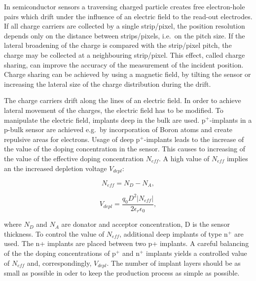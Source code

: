 
In semiconductor sensors a traversing charged particle creates free electron-hole pairs which drift under the influence of an electric field to the read-out electrodes. 
If all charge carriers are collected by a single strip/pixel, the position resolution depends only on the distance between strips/pixels, i.e.\ on the pitch size. 
If the lateral broadening of the charge is compared with the strip/pixel pitch, the charge may be collected at a neighbouring strip/pixel. %
This effect, called charge sharing, can improve the accuracy of the measurement of the incident position. 
Charge sharing can be achieved by using a magnetic field, by tilting the sensor or increasing the lateral size of the charge distribution during the drift.

The charge carriers drift along the lines of an electric field. 
In order to achieve lateral movement of the charges, the electric field has to be modified. 
To manipulate the electric field, implants deep in the bulk are used. 
p$^+$-implants in a p-bulk sensor are achieved e.g.\ by incorporation of Boron atoms and create repulsive areas for electrons. 
Usage of deep p$^+$-implants leads to the increase of the value of the doping concentration in the sensor. 
This causes to increasing of the value of the effective doping concentration $N_{eff}$. 
A high value of $N_{eff}$ implies an the increased depletion voltage $V_{depl}$: 

\begin{equation}
 N_{eff}=N_{D}-N_{A} ,
\end{equation}

\begin{equation}
 V_{depl}=\frac{q_0 D^2 |N_{eff}|}{2 \epsilon_r \epsilon_0 } ,
\end{equation}

\noindent where $N_{D}$ and $N_{A}$ are donator and acceptor concentration, D is the sensor thickness.
To control the value of $N_{eff}$, additional deep implants of type n$^+$ are used. 
The n+ implants are placed between two p+ implants. %
A careful balancing of the the doping concentrations of p$^+$ and n$^+$ implants yields a controlled value of $N_{eff}$ and, correspondingly, $V_{depl}$. 
The number of implant layers should be as small as possible in oder to keep the production process as simple as possible. 

